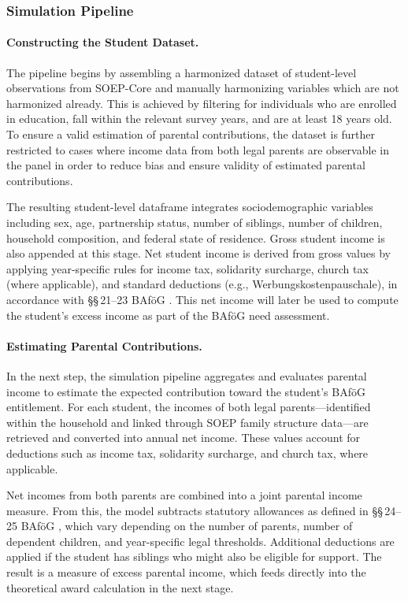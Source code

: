 \subsubsection{Simulation Pipeline}

\paragraph{Constructing the Student Dataset.}
The pipeline begins by assembling a harmonized dataset of student-level observations from SOEP-Core and manually harmonizing variables which are not harmonized already.
This is achieved by filtering for individuals who are enrolled in education, fall within the relevant survey years, and are at least 18 years old. 
To ensure a valid estimation of parental contributions, the dataset is further restricted to cases where income data from both legal parents are observable in the panel in order to reduce bias and ensure validity of estimated parental contributions.

The resulting student-level dataframe integrates sociodemographic variables including sex, age, partnership status, number of siblings, number of children, household composition, and federal state of residence. 
Gross student income is also appended at this stage. 
Net student income is derived from gross values by applying year-specific rules for income tax, solidarity surcharge, church tax (where applicable), and standard deductions (e.g., Werbungskostenpauschale), in accordance with §§\,21–23 BAföG \citep{bafoeg_law}.
This net income will later be used to compute the student’s excess income as part of the BAföG need assessment.


\paragraph{Estimating Parental Contributions.}
In the next step, the simulation pipeline aggregates and evaluates parental income to estimate the expected contribution toward the student’s BAföG entitlement. 
For each student, the incomes of both legal parents—identified within the household and linked through SOEP family structure data—are retrieved and converted into annual net income. 
These values account for deductions such as income tax, solidarity surcharge, and church tax, where applicable.

Net incomes from both parents are combined into a joint parental income measure. 
From this, the model subtracts statutory allowances as defined in §§\,24–25 BAföG \citep{bafoeg_law}, which vary depending on the number of parents, number of dependent children, and year-specific legal thresholds. 
Additional deductions are applied if the student has siblings who might also be eligible for support. 
The result is a measure of excess parental income, which feeds directly into the theoretical award calculation in the next stage.

